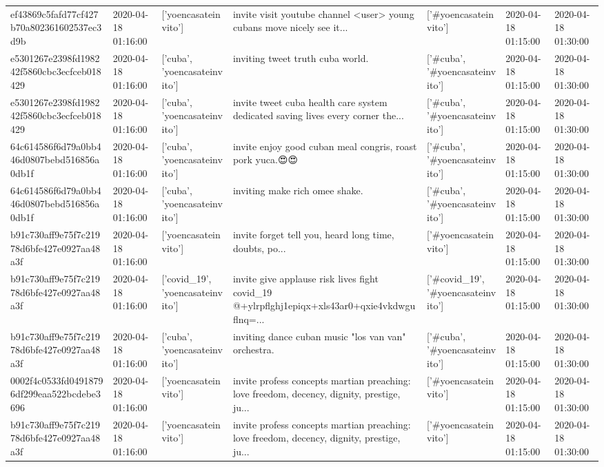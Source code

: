 \begin{tabular}{lllllll}
ef43869c5fafd77cf427b70a802361602537ec3d9b & 2020-04-18 01:16:00 & ['yoencasateinvito'] & invite visit youtube channel <user> young cubans move nicely see it... & ['#yoencasateinvito'] & 2020-04-18 01:15:00 & 2020-04-18 01:30:00 \\
e5301267e2398fd198242f5860cbc3ecfceb018429 & 2020-04-18 01:16:00 & ['cuba', 'yoencasateinvito'] & inviting tweet truth cuba world. & ['#cuba', '#yoencasateinvito'] & 2020-04-18 01:15:00 & 2020-04-18 01:30:00 \\
e5301267e2398fd198242f5860cbc3ecfceb018429 & 2020-04-18 01:16:00 & ['cuba', 'yoencasateinvito'] & invite tweet cuba health care system dedicated saving lives every corner the... & ['#cuba', '#yoencasateinvito'] & 2020-04-18 01:15:00 & 2020-04-18 01:30:00 \\
64c614586f6d79a0bb446d0807bebd516856a0db1f & 2020-04-18 01:16:00 & ['cuba', 'yoencasateinvito'] & invite enjoy good cuban meal congris, roast pork yuca.😍😍 & ['#cuba', '#yoencasateinvito'] & 2020-04-18 01:15:00 & 2020-04-18 01:30:00 \\
64c614586f6d79a0bb446d0807bebd516856a0db1f & 2020-04-18 01:16:00 & ['cuba', 'yoencasateinvito'] & inviting make rich omee shake. & ['#cuba', '#yoencasateinvito'] & 2020-04-18 01:15:00 & 2020-04-18 01:30:00 \\
b91c730aff9e75f7c21978d6bfe427e0927aa48a3f & 2020-04-18 01:16:00 & ['yoencasateinvito'] & invite forget tell you, heard long time, doubts, po... & ['#yoencasateinvito'] & 2020-04-18 01:15:00 & 2020-04-18 01:30:00 \\
b91c730aff9e75f7c21978d6bfe427e0927aa48a3f & 2020-04-18 01:16:00 & ['covid_19', 'yoencasateinvito'] & invite give applause risk lives fight covid\_19 @+ylrpflghj1epiqx+xls43ar0+qxie4vkdwguflnq=... & ['#covid_19', '#yoencasateinvito'] & 2020-04-18 01:15:00 & 2020-04-18 01:30:00 \\
b91c730aff9e75f7c21978d6bfe427e0927aa48a3f & 2020-04-18 01:16:00 & ['cuba', 'yoencasateinvito'] & inviting dance cuban music "los van van" orchestra. & ['#cuba', '#yoencasateinvito'] & 2020-04-18 01:15:00 & 2020-04-18 01:30:00 \\
0002f4c0533fd04918796df299eaa522bcdebe3696 & 2020-04-18 01:16:00 & ['yoencasateinvito'] & invite profess concepts martian preaching: love freedom, decency, dignity, prestige, ju... & ['#yoencasateinvito'] & 2020-04-18 01:15:00 & 2020-04-18 01:30:00 \\
b91c730aff9e75f7c21978d6bfe427e0927aa48a3f & 2020-04-18 01:16:00 & ['yoencasateinvito'] & invite profess concepts martian preaching: love freedom, decency, dignity, prestige, ju... & ['#yoencasateinvito'] & 2020-04-18 01:15:00 & 2020-04-18 01:30:00 \\

\end{tabular}
